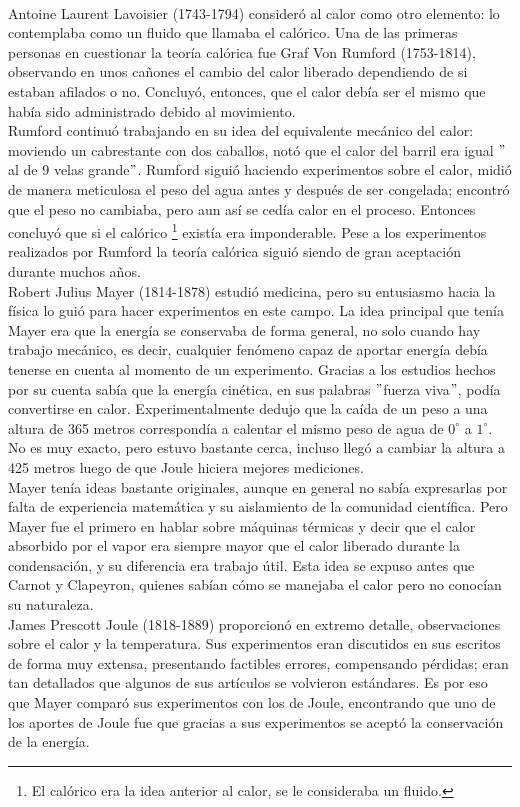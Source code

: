 \\
Antoine Laurent Lavoisier (1743-1794) consideró al calor como otro elemento: lo contemplaba como un fluido que llamaba el calórico. Una de las primeras personas en cuestionar la teoría calórica fue Graf Von Rumford (1753-1814), observando en unos cañones el cambio del calor liberado dependiendo de si estaban afilados o no. Concluyó, entonces, que el calor debía ser el mismo que había sido administrado debido al movimiento.
\\
Rumford continuó trabajando en su idea del equivalente mecánico del calor: moviendo un cabrestante con dos caballos, notó que el calor del barril era igual $"$al de 9 velas grande$"$. Rumford siguió haciendo experimentos sobre el calor, midió de manera meticulosa el peso del agua antes y después de ser congelada; encontró que el peso no cambiaba, pero aun así se cedía calor en el proceso. Entonces concluyó que si el calórico \footnote{El calórico era la idea anterior al calor, se le consideraba un fluido.} existía era imponderable. Pese a los experimentos realizados por Rumford la teoría calórica siguió siendo de gran aceptación durante muchos años.  	
\\
Robert Julius Mayer (1814-1878) estudió medicina, pero su entusiasmo hacia la física lo guió para hacer experimentos en este campo. La idea principal que tenía Mayer era que la energía se conservaba de forma general, no solo cuando hay trabajo mecánico, es decir, cualquier fenómeno capaz de aportar energía debía tenerse en cuenta al momento de un experimento. Gracias a los estudios hechos por su cuenta sabía que la energía cinética, en sus palabras $"$fuerza viva$"$, podía convertirse en calor. Experimentalmente dedujo que la caída de un peso a una altura de 365 metros correspondía a calentar el mismo peso de agua de $0^{\circ}$ a $1^{\circ}$. No es muy exacto, pero estuvo bastante cerca, incluso llegó a cambiar la altura a 425 metros luego de que Joule hiciera mejores mediciones.
\\
Mayer tenía ideas bastante originales, aunque en general no sabía expresarlas por falta de experiencia matemática y su aislamiento de la comunidad científica. Pero Mayer fue el primero en hablar sobre máquinas térmicas y decir que el calor absorbido por el vapor era siempre mayor que el calor liberado durante la condensación, y su diferencia era trabajo útil. Esta idea se expuso antes que Carnot y Clapeyron, quienes  sabían cómo se manejaba el calor pero no conocían su naturaleza.
\\
James Prescott Joule (1818-1889) proporcionó en extremo detalle, observaciones sobre el calor y la temperatura. Sus experimentos eran discutidos en sus escritos de forma muy extensa, presentando factibles errores, compensando pérdidas; eran tan detallados que algunos de sus artículos se volvieron estándares. Es por eso que Mayer comparó sus experimentos con los de Joule, encontrando que uno de los aportes de Joule fue que gracias a sus experimentos se aceptó la conservación de la energía.
